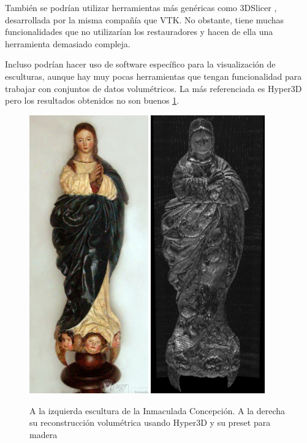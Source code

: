 También se podrían utilizar herramientas más genéricas como 3DSlicer \cite{slicer}, desarrollada por la misma compañía que VTK. No obstante, tiene muchas funcionalidades que no utilizarían los restauradores y hacen de ella una herramienta demasiado compleja.

Incluso podrían hacer uso de software específico para la visualización de esculturas, aunque hay muy pocas herramientas que tengan funcionalidad para trabajar con conjuntos de datos volumétricos. La más referenciada es Hyper3D \cite{hyper3D} pero los resultados obtenidos no son buenos \ref{fig:hyper3d_results}.

\begin{figure}[H]
	\centering
	\includegraphics[height=12cm]{imagenes/inmaculada_concepcion_real}
	\includegraphics[height=12cm]{imagenes/inmaculada_concepcion_hyper3d}
	\caption{A la izquierda escultura de la Inmaculada Concepción. A la derecha su reconstrucción volumétrica usando Hyper3D y su preset para madera}
	\label{fig:hyper3d_results}
\end{figure}

